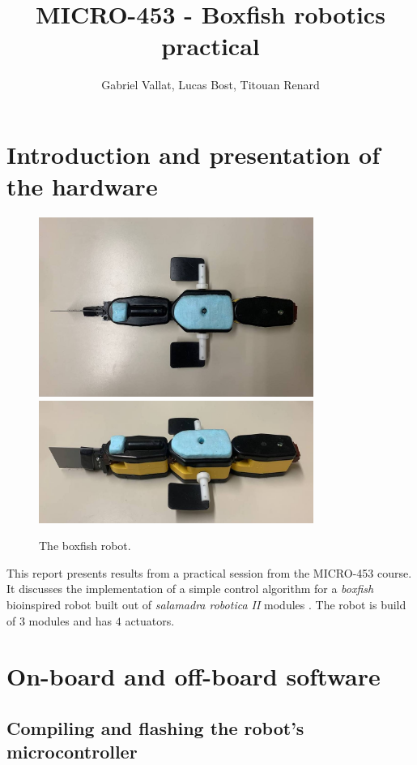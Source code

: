 \documentclass[11pt]{article}
\title{MICRO-453 - Boxfish robotics practical}
\author{Gabriel Vallat, Lucas Bost, Titouan Renard}
\begin{document}
\maketitle
\tableofcontents
\section{Introduction and presentation of the hardware}

\begin{figure}[h!]
    \centering
    \includegraphics[width=0.8\textwidth]{figures/top.jpg}
    \includegraphics[width=0.8\textwidth]{figures/side.jpg}
    \caption{The boxfish robot.}
    \label{boxfish}
\end{figure}

This report presents results from a practical session from the MICRO-453 course. It discusses the implementation of a simple control algorithm for a \textit{boxfish} bioinspired robot built out of \textit{salamadra robotica II} modules \cite{salamadra_robotica_2}. The robot is build of $3$ modules and has $4$ actuators.

\section{On-board and off-board software}


\subsection{Compiling and flashing the robot's microcontroller}
\end{document}
